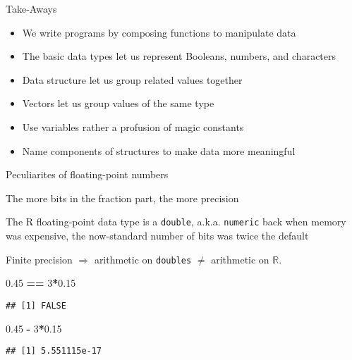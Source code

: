 \documentclass[8pt,ignorenonframetext,]{beamer}
\newenvironment{Shaded}{\begin{snugshade}}{\end{snugshade}}
\newcommand{\DecValTok}[1]{\textcolor[rgb]{0.00,0.00,0.81}{#1}}
\newcommand{\FloatTok}[1]{\textcolor[rgb]{0.00,0.00,0.81}{#1}}
\newcommand{\StringTok}[1]{\textcolor[rgb]{0.31,0.60,0.02}{#1}}
\newcommand{\OperatorTok}[1]{\textcolor[rgb]{0.81,0.36,0.00}{\textbf{#1}}}
\providecommand{\tightlist}{%
  \setlength{\itemsep}{0pt}\setlength{\parskip}{0pt}}
\begin{document}
\begin{frame}{Take-Aways}

\begin{itemize}
\tightlist
\item
  We write programs by composing functions to manipulate data
\item
  The basic data types let us represent Booleans, numbers, and
  characters
\item
  Data structure let us group related values together
\item
  Vectors let us group values of the same type
\item
  Use variables rather a profusion of magic constants
\item
  Name components of structures to make data more meaningful
\end{itemize}

\end{frame}

\begin{frame}[fragile]{Peculiarites of floating-point numbers}

The more bits in the fraction part, the more precision

The R floating-point data type is a \texttt{double}, a.k.a.
\texttt{numeric} back when memory was expensive, the now-standard number
of bits was twice the default

Finite precision \(\Rightarrow\) arithmetic on \texttt{doubles} \(\neq\)
arithmetic on \(\mathbb{R}\).

\end{frame}

\begin{frame}[fragile]{}

\begin{Shaded}
\begin{Highlighting}[]
\FloatTok{0.45} \OperatorTok{==}\StringTok{ }\DecValTok{3}\OperatorTok{*}\FloatTok{0.15}
\end{Highlighting}
\end{Shaded}

\begin{verbatim}
## [1] FALSE
\end{verbatim}

\begin{Shaded}
\begin{Highlighting}[]
\FloatTok{0.45} \OperatorTok{-}\StringTok{ }\DecValTok{3}\OperatorTok{*}\FloatTok{0.15}
\end{Highlighting}
\end{Shaded}

\begin{verbatim}
## [1] 5.551115e-17
\end{verbatim}

\end{frame}
\end{document}
